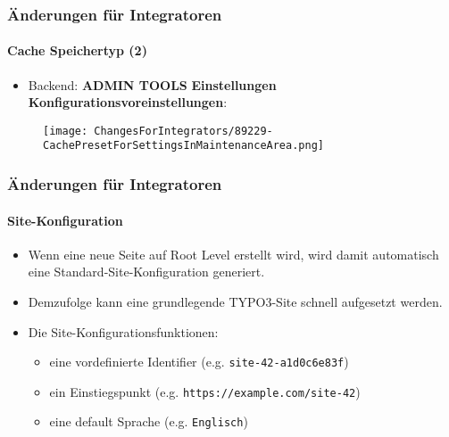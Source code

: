 \begin{frame}[fragile]
	\frametitle{Änderungen für Integratoren}
	\framesubtitle{Cache Speichertyp (2)}

	\begin{itemize}

		\item Backend: \textbf{ADMIN TOOLS} \hspace{0.1cm}\textbf{Einstellungen} \hspace{0.1cm}\textbf{Konfigurationsvoreinstellungen}:
	\end{itemize}

	\begin{figure}
		\texttt{[image: ChangesForIntegrators/89229-CachePresetForSettingsInMaintenanceArea.png]}
	\end{figure}

\end{frame}


\begin{frame}[fragile]
	\frametitle{Änderungen für Integratoren}
	\framesubtitle{Site-Konfiguration}

	\begin{itemize}
		\item Wenn eine neue Seite auf Root Level erstellt wird, wird damit automatisch
			eine Standard-Site-Konfiguration generiert.
		\item Demzufolge kann eine grundlegende TYPO3-Site schnell aufgesetzt werden.
		\item Die Site-Konfigurationsfunktionen:

			\begin{itemize}
				\item eine vordefinierte Identifier (e.g. \texttt{site-42-a1d0c6e83f})
				\item ein Einstiegspunkt (e.g. \texttt{https://example.com/site-42})
				\item eine default Sprache (e.g. \texttt{Englisch})
			\end{itemize}

	\end{itemize}

\end{frame}


